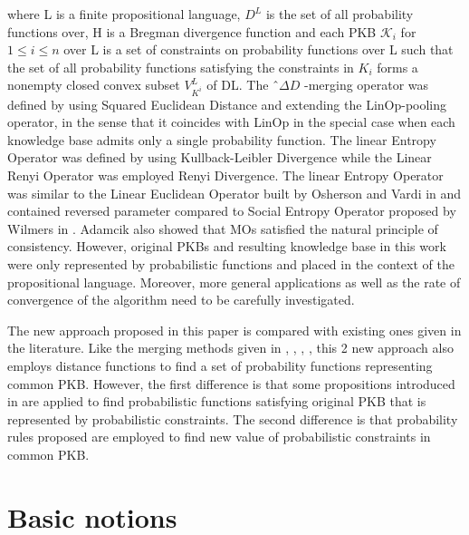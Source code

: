 \documentclass[]{iosart2c}
\begin{document}
  where L is a finite propositional language, $D^L$ is the set of all probability functions over, H is a Bregman divergence function and each PKB $\mathcal{K}_i$ for $1 \le i \le n$ over L is a set of constraints on probability functions over L such that the set of all probability functions satisfying the constraints in $K_i$ forms a nonempty closed convex subset $V^L_{K^i}$ of DL. The ˆ$\Delta D$ -merging operator was defined by using Squared Euclidean Distance and extending the LinOp-pooling operator, in the sense that it coincides with LinOp in the special case when each knowledge base admits only a single probability function. The linear Entropy Operator was defined by using Kullback-Leibler Divergence while the Linear Renyi Operator was employed Renyi Divergence. The linear Entropy Operator was similar to the Linear Euclidean Operator built by Osherson and Vardi in \cite{26} and contained reversed parameter compared to Social Entropy Operator proposed by Wilmers in \cite{21}. Adamcik also showed that MOs satisfied the natural principle of consistency. However, original PKBs and resulting knowledge base in this work were only represented by probabilistic functions and placed in the context of the propositional language. Moreover, more general applications as well as the rate of convergence of the algorithm need to be carefully investigated.

  The new approach proposed in this paper is compared with existing ones given in the literature. Like the merging methods given in \citep{18}, \citep{21}, \citep{23}, \citep{26}, this 2 new approach also employs distance functions to find a set of probability functions representing common PKB. However, the first difference is that some propositions introduced in \citep{9} \citep{10} are applied to find probabilistic functions satisfying original PKB that is represented by probabilistic constraints. The second difference is that probability rules proposed \cite{27} are employed to find new value of probabilistic constraints in common PKB.


  \section{Basic notions}
\end{document}
